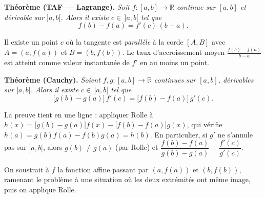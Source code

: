 ﻿%



\begin{tcolorbox}[thmbox]
  \textbf{Théorème (TAF — Lagrange).}\enspace%
  \textit{Soit $f : [a,b] \to \mathbb{R}$ continue sur $[a,b]$ et dérivable sur $]a,b[$.
  Alors il existe $c \in\, ]a,b[$ tel que}
  \[
    f(b) - f(a) = f'(c)\,(b-a).
  \]
\end{tcolorbox}

Il existe un point $c$ où la tangente est \emph{parallèle} à la corde $[A,B]$
avec $A = (a, f(a))$ et $B = (b, f(b))$. Le taux d'accroissement moyen
$\frac{f(b)-f(a)}{b-a}$ est atteint comme valeur instantanée de $f'$ en au moins un point.


\begin{tcolorbox}[thmbox]
  \textbf{Théorème (Cauchy).}\enspace%
  \textit{Soient $f, g : [a,b] \to \mathbb{R}$ continues sur $[a,b]$, dérivables sur $]a,b[$.
  Alors il existe $c \in\, ]a,b[$ tel que}
  \[
    \bigl[g(b)-g(a)\bigr]\,f'(c) = \bigl[f(b)-f(a)\bigr]\,g'(c).
  \]
\end{tcolorbox}

\noindent
La preuve tient en une ligne : appliquer Rolle à
$h(x) = \bigl[g(b)-g(a)\bigr]f(x) - \bigl[f(b)-f(a)\bigr]g(x)$,
qui vérifie $h(a) = g(b)f(a) - f(b)g(a) = h(b)$.
En particulier, si $g'$ ne s'annule pas sur $]a,b[$, alors $g(b)\neq g(a)$ (par Rolle) et
$\dfrac{f(b)-f(a)}{g(b)-g(a)} = \dfrac{f'(c)}{g'(c)}$.

\decsep{}


\begin{ideepreuve}
On soustrait à $f$ la fonction affine passant par $(a,f(a))$ et $(b,f(b))$,
ramenant le problème à une situation où les deux extrémités ont même image,
puis on applique Rolle.
\end{ideepreuve}

